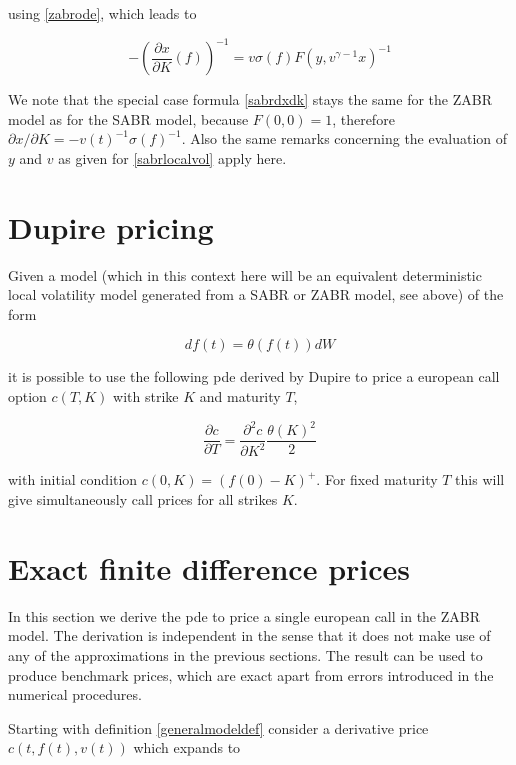\documentclass{amsart}
\theoremstyle{plain}
\numberwithin{equation}{section}
\begin{document}
using \ref{zabrode}, which leads to

\begin{equation}\label{zabrlocalvol}
-\left(\frac{\partial x}{\partial K}(f)\right)^{-1} = v\sigma(f)F(y,v^{\gamma-1}x)^{-1}
\end{equation}

We note that the special case formula \ref{sabrdxdk} stays the same for the ZABR model as for the SABR model,
because $F(0,0) = 1$, therefore $\partial{x} / \partial{K} = -v(t)^{-1}\sigma(f)^{-1}$. Also the same remarks
concerning the evaluation of $y$ and $v$ as given for \ref{sabrlocalvol} apply here.

\section{Dupire pricing}

Given a model (which in this context here will be an equivalent deterministic local volatility model generated
from a SABR or ZABR model, see above) of the form

\begin{equation}
df(t) = \theta(f(t)) dW
\end{equation}

it is possible to use the following pde derived by Dupire to price a european call option $c(T,K)$ with strike $K$ and maturity $T$,

\begin{equation}\label{DupirePde}
\frac{\partial c}{\partial T} = \frac{\partial^2 c}{\partial K^2} \frac{\theta(K)^2}{2}
\end{equation}

with initial condition $c(0,K)=(f(0)-K)^+$. For fixed maturity $T$ this will give simultaneously call prices for all strikes $K$.

\section{Exact finite difference prices}

In this section we derive the pde to price a single european call in the ZABR model. The derivation is independent in the sense
that it does not make use of any of the approximations in the previous sections. The result can be used to produce benchmark
prices, which are exact apart from errors introduced in the numerical procedures.

Starting with definition \ref{generalmodeldef} consider a derivative price $c(t,f(t),v(t))$ which expands to
\end{document}
